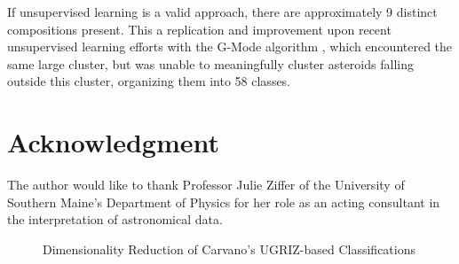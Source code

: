 \documentclass[conference]{IEEEtran}
\begin{document}
If unsupervised learning is a valid approach, there are approximately 9 distinct compositions present. This a replication and improvement upon recent unsupervised learning efforts with the G-Mode algorithm \cite{hm_gmode}, which encountered the same large cluster, but was unable to meaningfully cluster asteroids falling outside this cluster, organizing them into 58 classes.
\\


\section*{Acknowledgment}
The author would like to thank Professor Julie Ziffer of the University of Southern Maine's Department of Physics for her role as an acting consultant in the interpretation of astronomical data.




\begin{figure}[H]
\centering
{}
\hfil
{}
\caption{Dimensionality Reduction of Carvano's UGRIZ-based Classifications}
\label{fig:carvano}
\end{figure}
\end{document}
